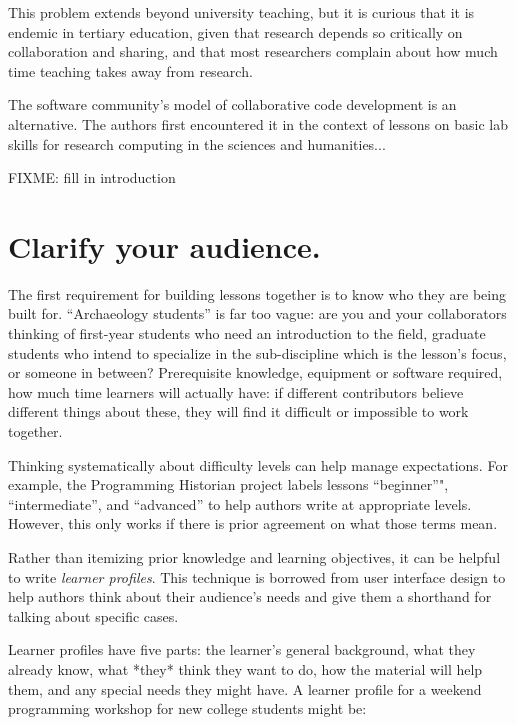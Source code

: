 \documentclass[10pt,letterpaper]{article}
\newcommand{\rulemajor}[1]{\section{#1}}
\begin{document}
This problem extends beyond university teaching,
but it is curious that it is endemic in tertiary education,
given that research depends so critically on collaboration and sharing,
and that most researchers complain about how much time teaching takes away from research.

The software community's model of collaborative code development is an alternative.
The authors first encountered it in the context of
lessons on basic lab skills for research computing
in the sciences and humanities...

FIXME: fill in introduction

\rulemajor{Clarify your audience.}

The first requirement for building lessons together is
to know who they are being built for.
``Archaeology students'' is far too vague:
are you and your collaborators thinking of
first-year students who need an introduction to the field,
graduate students who intend to specialize in the sub-discipline which is the lesson's focus,
or someone in between?
Prerequisite knowledge,
equipment or software required,
how much time learners will actually have:
if different contributors believe different things about these,
they will find it difficult or impossible to work together.

Thinking systematically about difficulty levels can help manage expectations.
For example,
the Programming Historian project labels lessons ``beginner''",
``intermediate'',
and ``advanced''
to help authors write at appropriate levels.
However,
this only works if there is prior agreement on what those terms mean.

Rather than itemizing prior knowledge and learning objectives,
it can be helpful to write \emph{learner profiles}.
This technique is borrowed from user interface design
to help authors think about their audience's needs
and give them a shorthand for talking about specific cases.

Learner profiles have five parts:
the learner's general background,
what they already know,
what *they* think they want to do,
how the material will help them,
and any special needs they might have.
A learner profile for a weekend programming workshop for new college students might be:
\end{document}
